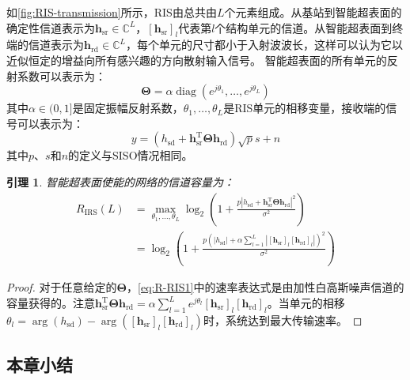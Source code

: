\documentclass[supercite]{HustGraduPaper}
\newtheorem{lemma}{\indent 引理}[section]
\begin{document}
如\autoref{fig:RIS-transmission}所示，RIS由总共由$L$个元素组成。从基站到智能超表面的确定性信道表示为$\mathbf{h}_{\mathrm{sr}} \in \mathbb{C}^{L}$，$\left[\mathbf{h}_{\mathrm{sr}}\right]_{l}$代表第$l$个结构单元的信道。从智能超表面到终端的信道表示为$\mathbf{h}_{\mathrm{rd}} \in \mathbb{C}^{L}$，每个单元的尺寸都小于入射波波长，这样可以认为它以近似恒定的增益向所有感兴趣的方向散射输入信号\cite{emil2019intelligent}。
智能超表面的所有单元的反射系数可以表示为：
\begin{equation}
	\boldsymbol{\Theta}=\alpha \operatorname{diag}\left(e^{j \theta_{1}}, \ldots, e^{j \theta_{L}}\right)
\end{equation}
其中$\alpha \in (0,1]$是固定振幅反射系数，$\theta_{1}, \ldots, \theta_{L}$是RIS单元的相移变量，接收端的信号可以表示为：
\begin{equation}
	y=\left(h_{\mathrm{sd}}+\mathbf{h}_{\mathrm{sr}}^{\mathrm{T}} \boldsymbol{\Theta} \mathbf{h}_{\mathrm{rd}}\right) \sqrt{p} s+n
\end{equation}
其中$p$、$s$和$n$的定义与SISO情况相同。

\begin{lemma}
	智能超表面使能的网络的信道容量为：
	\begin{align}
		R_{\mathrm{IRS}}(L) &=\max _{\theta_{1}, \ldots, \theta_{L}} \log _{2}\left(1+\frac{p\left|h_{\mathrm{sd}}+\mathbf{h}_{\mathrm{sr}}^{\mathrm{T}} \boldsymbol{\Theta} \mathbf{h}_{\mathrm{rd}}\right|^{2}}{\sigma^{2}}\right) \label{eq:R-RIS1} \\
		&=\log _{2}\left(1+\frac{p\left(\left|h_{\mathrm{sd}}\right|+\alpha \sum_{l=1}^{L}\left|\left[\mathbf{h}_{\mathrm{sr}}\right]_{l}\left[\mathbf{h}_{\mathrm{rd}}\right]_{l}\right|\right)^{2}}{\sigma^{2}}\right)
	\end{align}
\end{lemma}

\begin{proof}
	对于任意给定的$\boldsymbol{\Theta}$，\autoref{eq:R-RIS1}中的速率表达式是由加性白高斯噪声信道的容量获得的。注意$ \mathbf{h}_{\mathrm{sr}}^{\mathrm{T}} \boldsymbol{\Theta} \mathbf{h}_{\mathrm{rd}} = \alpha \sum_{l=1}^{L} e^{j\theta_l} \left[\mathbf{h}_{\mathrm{sr}}\right]_{l}\left[\mathbf{h}_{\mathrm{rd}}\right]_{l} $。当单元的相移$\theta_{l}=\arg \left(h_{\mathrm{sd}}\right)-\arg \left(\left[\mathbf{h}_{\mathrm{sr}}\right]_{l}\left[\mathbf{h}_{\mathrm{rd}}\right]_{l}\right)$时，系统达到最大传输速率。
\end{proof}

\subsection{本章小结}
\end{document}
